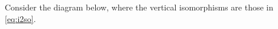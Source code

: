 %

%
%


Consider the diagram below, where the vertical isomorphisms are those in \eqref{eq:i2so}.

